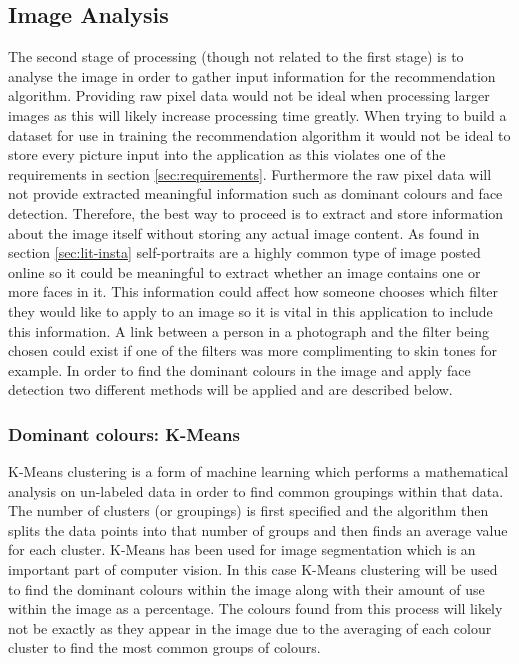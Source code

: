 \documentclass[a4paper,12pt]{report}
\begin{document}
      \subsection{Image Analysis}
        The second stage of processing (though not related to the first stage) is to analyse the image in order to gather input information for the recommendation algorithm. Providing raw pixel data would not be ideal when processing larger images as this will likely increase processing time greatly. When trying to build a dataset for use in training the recommendation algorithm it would not be ideal to store every picture input into the application as this violates one of the requirements in section \ref{sec:requirements}. Furthermore the raw pixel data will not provide extracted meaningful information such as dominant colours and face detection. Therefore, the best way to proceed is to extract and store information about the image itself without storing any actual image content. As found in section \ref{sec:lit-insta} self-portraits are a highly common type of image posted online so it could be meaningful to extract whether an image contains one or more faces in it. This information could affect how someone chooses which filter they would like to apply to an image so it is vital in this application to include this information. A link between a person in a photograph and the filter being chosen could exist if one of the filters was more complimenting to skin tones for example. In order to find the dominant colours in the image and apply face detection two different methods will be applied and are described below.

        \subsubsection{Dominant colours: K-Means} \label{sec:kmeans}
          K-Means clustering \citep{macqueen1967some} is a form of machine learning which performs a mathematical analysis on un-labeled data in order to find common groupings within that data. The number of clusters (or groupings) is first specified and the algorithm then splits the data points into that number of groups and then finds an average value for each cluster. K-Means has been used for image segmentation \citep{coleman1979image,shi2000normalized} which is an important part of computer vision. In this case K-Means clustering will be used to find the dominant colours within the image along with their amount of use within the image as a percentage. The colours found from this process will likely not be exactly as they appear in the image due to the averaging of each colour cluster to find the most common groups of colours.
\end{document}
